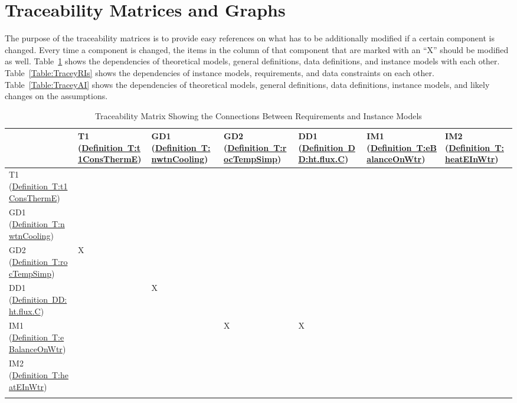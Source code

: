 \documentclass[12pt]{article}
\begin{document}
\section{Traceability Matrices and Graphs}
\label{Sec:TraceMatrices}
The purpose of the traceability matrices is to provide easy references on what has to be additionally modified if a certain component is changed. Every time a component is changed, the items in the column of that component that are marked with an ``X'' should be modified as well. Table~\ref{Table:TraceyRI} shows the dependencies of theoretical models, general definitions, data definitions, and instance models with each other. Table~\ref{Table:TraceyRIs} shows the dependencies of instance models, requirements, and data constraints on each other. Table~\ref{Table:TraceyAI} shows the dependencies of theoretical models, general definitions, data definitions, instance models, and likely changes on the assumptions.
\begin{longtable}{l l l l l l l}
\toprule
 & T1 (\hyperref[T:t1ConsThermE]{Definition~T:t1ConsThermE}) & GD1 (\hyperref[T:nwtnCooling]{Definition~T:nwtnCooling}) & GD2 (\hyperref[T:rocTempSimp]{Definition~T:rocTempSimp}) & DD1 (\hyperref[DD:ht.flux.C]{Definition~DD:ht.flux.C}) & IM1 (\hyperref[T:eBalanceOnWtr]{Definition~T:eBalanceOnWtr}) & IM2 (\hyperref[T:heatEInWtr]{Definition~T:heatEInWtr})
\\
\midrule
T1 (\hyperref[T:t1ConsThermE]{Definition~T:t1ConsThermE}) &  &  &  &  &  & 
\\
GD1 (\hyperref[T:nwtnCooling]{Definition~T:nwtnCooling}) &  &  &  &  &  & 
\\
GD2 (\hyperref[T:rocTempSimp]{Definition~T:rocTempSimp}) & X &  &  &  &  & 
\\
DD1 (\hyperref[DD:ht.flux.C]{Definition~DD:ht.flux.C}) &  & X &  &  &  & 
\\
IM1 (\hyperref[T:eBalanceOnWtr]{Definition~T:eBalanceOnWtr}) &  &  & X & X &  & 
\\
IM2 (\hyperref[T:heatEInWtr]{Definition~T:heatEInWtr}) &  &  &  &  &  & 
\\
\bottomrule
\caption{Traceability Matrix Showing the Connections Between Requirements and Instance Models}
\label{Table:TraceyRI}
\end{longtable}
\end{document}
